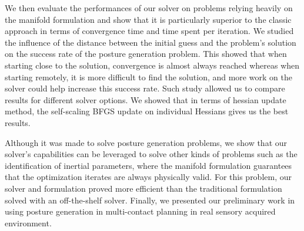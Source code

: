 We then evaluate the performances of our solver on problems relying heavily on the manifold formulation and show that it is particularly superior to the classic approach in terms of convergence time and time spent per iteration.
We studied the influence of the distance between the initial guess and the problem's solution on the success rate of the posture generation problem.
This showed that when starting close to the solution, convergence is almost always reached whereas when starting remotely, it is more difficult to find the solution, and more work on the solver could help increase this success rate.
Such study allowed us to compare results for different solver options.
We showed that in terms of hessian update method, the self-scaling BFGS update on individual Hessians gives us the best results.

Although it was made to solve posture generation problems, we show that our solver's capabilities can be leveraged to solve other kinds of problems such as the identification of inertial parameters, where the manifold formulation guarantees that the optimization iterates are always physically valid.
For this problem, our solver and formulation proved more efficient than the traditional formulation solved with an off-the-shelf solver.
Finally, we presented our preliminary work in using posture generation in multi-contact planning in real sensory acquired environment.


